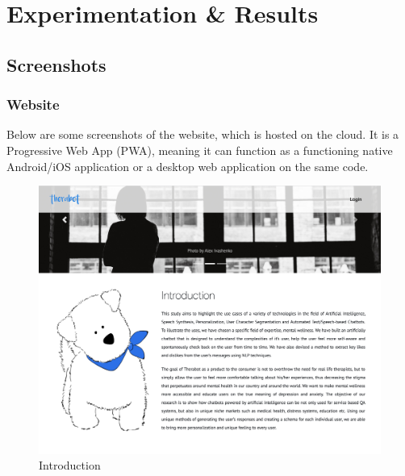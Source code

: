 \chapter{Experimentation \& Results}

\pagebreak

\section{Screenshots}

\subsection{Website}

\noindent
Below are some screenshots of the website, which is hosted on the cloud. It is a Progressive Web App (PWA), meaning it can function as a functioning native Android/iOS application or a desktop web application on the same code.

\vspace*{\fill}
\begin{figure}[H]
    \centering
    \includegraphics[width=\linewidth]{images/screenshots/website/website-introduction.png}
    \caption{Introduction}
\end{figure}
\vspace*{\fill}

\pagebreak

